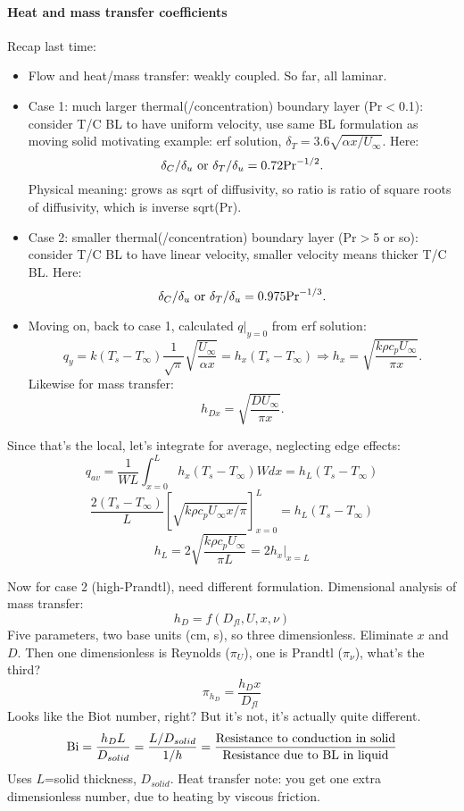 \documentclass{report}
\begin{document}
\paragraph{Heat and mass transfer coefficients}

Recap last time:
\begin{itemize}
\item Flow and heat/mass transfer: weakly coupled.  So far, all laminar.
\item Case 1: much larger thermal(/concentration) boundary layer (Pr$<$0.1):
  consider T/C BL to have uniform velocity, use same BL formulation as moving
  solid motivating example: erf solution, $\delta_T=3.6\sqrt{\alpha
    x/U_\infty}$.  Here:
  $$\delta_C/\delta_u\ {\rm or}\ \delta_T/\delta_u=0.72{\rm Pr}^{-1/2}.$$
  Physical meaning: grows as sqrt of diffusivity, so ratio is ratio of square
  roots of diffusivity, which is inverse sqrt(Pr).
\item Case 2: smaller thermal(/concentration) boundary layer (Pr$>$5 or so):
  consider T/C BL to have linear velocity, smaller velocity means thicker T/C
  BL.  Here:
  $$\delta_C/\delta_u\ {\rm or}\ \delta_T/\delta_u=0.975{\rm Pr}^{-1/3}.$$
\item Moving on, back to case 1, calculated $q|_{y=0}$ from erf solution:
  $$q_y = k(T_s-T_\infty)\frac{1}{\sqrt{\pi}}\sqrt{\frac{U_\infty}{\alpha x}} =
  h_x(T_s-T_\infty) \Rightarrow
  h_x = \sqrt{\frac{k\rho c_p U_\infty}{\pi x}}.$$
  Likewise for mass transfer:
  $$h_{Dx} = \sqrt{\frac{DU_\infty}{\pi x}}.$$
\end{itemize}
Since that's the local, let's integrate for average, neglecting edge effects:
$$q_{av} = \frac{1}{WL}\int_{x=0}^L h_x (T_s-T_\infty) Wdx =
h_L (T_s-T_\infty)$$
$$\frac{2(T_s-T_\infty)}{L}\left[\sqrt{k\rho c_p U_\infty x/\pi}\right]_{x=0}^L =
h_L (T_s-T_\infty)$$
$$h_L = 2\sqrt{\frac{k\rho c_p U_\infty}{\pi L}} =
\left.2h_x\right|_{x=L}$$

Now for case 2 (high-Prandtl), need different formulation.  Dimensional
analysis of mass transfer:
$$h_D = f(D_{fl}, U, x, \nu)$$
Five parameters, two base units (cm, s), so three dimensionless.  Eliminate $x$
and $D$.  Then one dimensionless is Reynolds ($\pi_U$), one is Prandtl
($\pi_\nu$), what's the third?
$$\pi_{h_D} = \frac{h_D x}{D_{fl}}$$
Looks like the Biot number, right?  But it's not, it's actually quite
different.
$${\rm Bi} = \frac{h_D L}{D_{solid}} = \frac{L/D_{solid}}{1/h} =
\frac{\rm Resistance\ to\ conduction\ in\ solid}{\rm Resistance\ due\ to\ BL
  \ in\ liquid}$$
Uses $L$=solid thickness, $D_{solid}$.  Heat transfer note: you get one extra
dimensionless number, due to heating by viscous friction.
\end{document}
